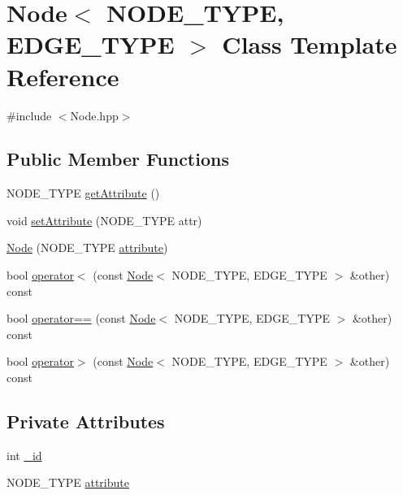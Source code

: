 \hypertarget{class_node}{\section{Node$<$ N\+O\+D\+E\+\_\+\+T\+Y\+P\+E, E\+D\+G\+E\+\_\+\+T\+Y\+P\+E $>$ Class Template Reference}
\label{class_node}
}


{\ttfamily \#include $<$Node.\+hpp$>$}

\subsection*{Public Member Functions}
\begin{DoxyCompactItemize}
\item 
N\+O\+D\+E\+\_\+\+T\+Y\+P\+E \hyperlink{class_node_a1272270025389e601164431b42ab5237}{get\+Attribute} ()
\item 
void \hyperlink{class_node_acb8f913ce2f995a6a14b9b05c60938f8}{set\+Attribute} (N\+O\+D\+E\+\_\+\+T\+Y\+P\+E attr)
\item 
\hyperlink{class_node_a94263af6c10cc9882d33918080dc722f}{Node} (N\+O\+D\+E\+\_\+\+T\+Y\+P\+E \hyperlink{class_node_a434cad0f70931bc3aaa048d52d0b0ee3}{attribute})
\item 
bool \hyperlink{class_node_a8c948b700aff182cd9dfde8d333f891f}{operator$<$} (const \hyperlink{class_node}{Node}$<$ N\+O\+D\+E\+\_\+\+T\+Y\+P\+E, E\+D\+G\+E\+\_\+\+T\+Y\+P\+E $>$ \&other) const 
\item 
bool \hyperlink{class_node_adebab344b10d7702080189976af90100}{operator==} (const \hyperlink{class_node}{Node}$<$ N\+O\+D\+E\+\_\+\+T\+Y\+P\+E, E\+D\+G\+E\+\_\+\+T\+Y\+P\+E $>$ \&other) const 
\item 
bool \hyperlink{class_node_a1a9b552b5f24907591310827434f1097}{operator$>$} (const \hyperlink{class_node}{Node}$<$ N\+O\+D\+E\+\_\+\+T\+Y\+P\+E, E\+D\+G\+E\+\_\+\+T\+Y\+P\+E $>$ \&other) const 
\end{DoxyCompactItemize}
\subsection*{Private Attributes}
\begin{DoxyCompactItemize}
\item 
int \hyperlink{class_node_a533ab17912d5b919a37ada31a8a78dc4}{\+\_\+id}
\item 
N\+O\+D\+E\+\_\+\+T\+Y\+P\+E \hyperlink{class_node_a434cad0f70931bc3aaa048d52d0b0ee3}{attribute}
\end{DoxyCompactItemize}


